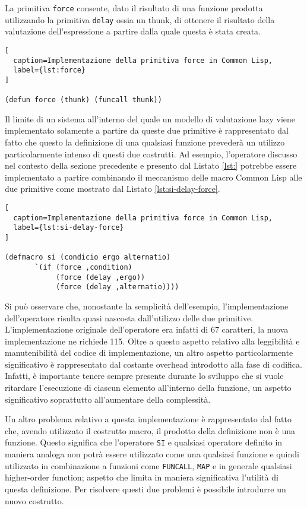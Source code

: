 La primitiva \texttt{force} consente, dato il risultato di una funzione prodotta utilizzando la primitiva \texttt{delay} ossia un thunk, di ottenere il risultato della valutazione dell'espressione a partire dalla quale questa è stata creata.

\begin{lstlisting}[
  caption=Implementazione della primitiva force in Common Lisp,
  label={lst:force}
]

(defun force (thunk) (funcall thunk))

\end{lstlisting}

Il limite di un sistema all'interno del quale un modello di valutazione lazy viene implementato solamente a partire da queste due primitive è rappresentato dal fatto che questo la definizione di una qualsiasi funzione prevederà un utilizzo particolarmente intenso di questi due costrutti. Ad esempio, l'operatore discusso nel contesto della sezione precedente e presento dal Listato \ref{lst:} potrebbe essere implementato a partire combinando il meccanismo delle macro Common Lisp alle due primitive come mostrato dal Listato \ref{lst:si-delay-force}.

\begin{lstlisting}[
  caption=Implementazione della primitiva force in Common Lisp,
  label={lst:si-delay-force}
]

(defmacro si (condicio ergo alternatio)
       `(if (force ,condition)
            (force (delay ,ergo))
            (force (delay ,alternatio))))

\end{lstlisting}

Si può osservare che, nonostante la semplicità dell'esempio, l'implementazione dell'operatore risulta quasi nascosta dall'utilizzo delle due primitive. L'implementazione originale dell'operatore era infatti di 67 caratteri, la nuova implementazione ne richiede 115. Oltre a questo aspetto relativo alla leggibilità e manutenibilità del codice di implementazione, un altro aspetto particolarmente significativo è rappresentato dal costante overhead introdotto alla fase di codifica. Infatti, è importante tenere sempre presente durante lo sviluppo che si vuole ritardare l'esecuzione di ciascun elemento all'interno della funzione, un aspetto significativo soprattutto all'aumentare della complessità.

Un altro problema relativo a questa implementazione è rappresentato dal fatto che, avendo utilizzato il costrutto macro, il prodotto della definizione non è una funzione. Questo significa che l'operatore \texttt{SI} e qualsiasi operatore definito in maniera analoga non potrà essere utilizzato come una qualsiasi funzione e quindi utilizzato in combinazione a funzioni come \texttt{FUNCALL}, \texttt{MAP} e in generale qualsiasi higher-order function; aspetto che limita in maniera significativa l'utilità di questa definizione. Per risolvere questi due problemi è possibile introdurre un nuovo costrutto.

